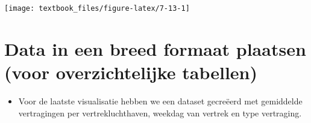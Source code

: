 \documentclass[]{tufte-book}
\newenvironment{Shaded}{}{}
\newcommand{\DataTypeTok}[1]{\textcolor[rgb]{0.56,0.13,0.00}{#1}}
\newcommand{\DecValTok}[1]{\textcolor[rgb]{0.25,0.63,0.44}{#1}}
\newcommand{\KeywordTok}[1]{\textcolor[rgb]{0.00,0.44,0.13}{\textbf{#1}}}
\newcommand{\NormalTok}[1]{#1}
\newcommand{\OperatorTok}[1]{\textcolor[rgb]{0.40,0.40,0.40}{#1}}
\newcommand{\StringTok}[1]{\textcolor[rgb]{0.25,0.44,0.63}{#1}}
\providecommand{\tightlist}{%
  \setlength{\itemsep}{0pt}\setlength{\parskip}{0pt}}
\begin{document}
\begin{Shaded}
\end{Shaded}

\texttt{[image: textbook\_files/figure-latex/7-13-1]}

\hypertarget{data-in-een-breed-formaat-plaatsen-voor-overzichtelijke-tabellen}{%
\section{Data in een breed formaat plaatsen (voor overzichtelijke tabellen)}\label{data-in-een-breed-formaat-plaatsen-voor-overzichtelijke-tabellen}}

\begin{itemize}
\tightlist
\item
  Voor de laatste visualisatie hebben we een dataset gecreëerd met gemiddelde vertragingen per vertrekluchthaven, weekdag van vertrek en type vertraging.
\end{itemize}
\end{document}
